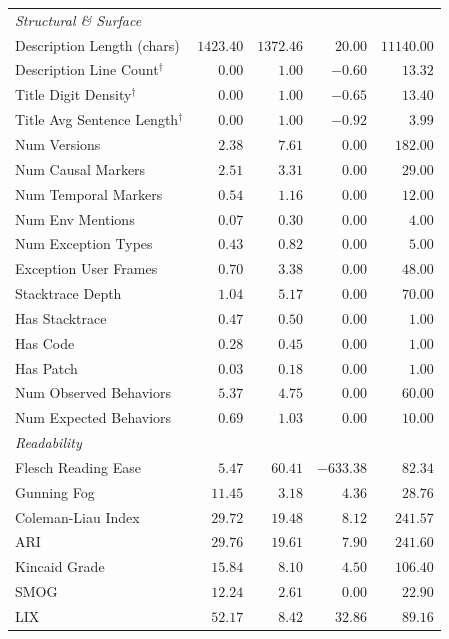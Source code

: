 \begin{table}[h]
\begin{tabular}{lrrrr}
    \midrule
    \multicolumn{5}{l}{\textit{Structural \& Surface}} \\
    Description Length (chars)          & $1423.40$ & $1372.46$ & $20.00$ & $11140.00$ \\
    Description Line Count$^\dagger$    & $0.00$ & $1.00$ & $-0.60$ & $13.32$ \\
    Title Digit Density$^\dagger$       & $0.00$ & $1.00$ & $-0.65$ & $13.40$ \\
    Title Avg Sentence Length$^\dagger$ & $0.00$ & $1.00$ & $-0.92$ & $3.99$ \\
    Num Versions                        & $2.38$ & $7.61$ & $0.00$ & $182.00$ \\
    Num Causal Markers                  & $2.51$ & $3.31$ & $0.00$ & $29.00$ \\
    Num Temporal Markers                & $0.54$ & $1.16$ & $0.00$ & $12.00$ \\
    Num Env Mentions                    & $0.07$ & $0.30$ & $0.00$ & $4.00$ \\
    Num Exception Types                 & $0.43$ & $0.82$ & $0.00$ & $5.00$ \\
    Exception User Frames               & $0.70$ & $3.38$ & $0.00$ & $48.00$ \\
    Stacktrace Depth                    & $1.04$ & $5.17$ & $0.00$ & $70.00$ \\
    Has Stacktrace                      & $0.47$ & $0.50$ & $0.00$ & $1.00$ \\
    Has Code                            & $0.28$ & $0.45$ & $0.00$ & $1.00$ \\
    Has Patch                           & $0.03$ & $0.18$ & $0.00$ & $1.00$ \\
    Num Observed Behaviors              & $5.37$ & $4.75$ & $0.00$ & $60.00$ \\
    Num Expected Behaviors              & $0.69$ & $1.03$ & $0.00$ & $10.00$ \\
    
    \midrule
    \multicolumn{5}{l}{\textit{Readability}} \\
    Flesch Reading Ease                 & $5.47$ & $60.41$ & $-633.38$ & $82.34$ \\
    Gunning Fog                         & $11.45$ & $3.18$ & $4.36$ & $28.76$ \\
    Coleman-Liau Index                  & $29.72$ & $19.48$ & $8.12$ & $241.57$ \\
    ARI                                 & $29.76$ & $19.61$ & $7.90$ & $241.60$ \\
    Kincaid Grade                       & $15.84$ & $8.10$ & $4.50$ & $106.40$ \\
    SMOG                                & $12.24$ & $2.61$ & $0.00$ & $22.90$ \\
    LIX                                 & $52.17$ & $8.42$ & $32.86$ & $89.16$ \\
    

\end{tabular}
\end{table}
